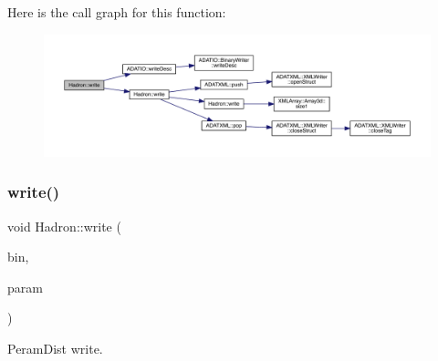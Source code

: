 Here is the call graph for this function\+:
\nopagebreak
\begin{figure}[H]
\begin{center}
\leavevmode
\includegraphics[width=350pt]{d1/daf/namespaceHadron_a6d8b26c4e0e11ca4b20e046f2595326e_cgraph}
\end{center}
\end{figure}
\mbox{\label{namespaceHadron_afebbe26d622d0f830042509739bee2da}} 
\subsubsection{\texorpdfstring{write()}{write()}\hspace{0.1cm}{\footnotesize\ttfamily [74/95]}}
{\footnotesize\ttfamily void Hadron\+::write (\begin{DoxyParamCaption}\item[{\mbox{\hyperlink{classADATIO_1_1BinaryWriter}{Binary\+Writer}} \&}]{bin,  }\item[{const \mbox{\hyperlink{structHadron_1_1ValPeramDist__t}{Val\+Peram\+Dist\+\_\+t}} \&}]{param }\end{DoxyParamCaption})}



Peram\+Dist write. 

